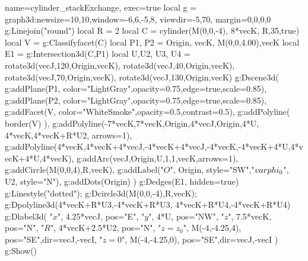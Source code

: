 \begin{luadraw}{name=cylinder_stackExchange, exec=true}
local g = graph3d:new{size={10,10},window={-6,6,-5,8}, viewdir={-5,70}, margin={0,0,0,0}}
g:Linejoin("round")
local R = 2
local C = cylinder(M(0,0,-4), 8*vecK, R,35,true)
local V = g:Classifyfacet(C)
local P1, P2 = {Origin, vecK}, {M(0,0,4.00),vecK}
local E1 = g:Intersection3d(C,P1)
local U,U2, U3, U4 = rotate3d(vecJ,120,{Origin,vecK}), rotate3d(vecJ,40,{Origin,vecK}), rotate3d(vecJ,70,{Origin,vecK}), rotate3d(vecJ,130,{Origin,vecK})
g:Dscene3d(
    g:addPlane(P1, {color="LightGray",opacity=0.75,edge=true,scale=0.85}),
    g:addPlane(P2, {color="LightGray",opacity=0.75,edge=true,scale=0.85}),
    g:addFacet(V, {color="WhiteSmoke",opacity=0.5,contrast=0.5}),
    g:addPolyline( border(V) ),
    g:addPolyline({{-7*vecK,7*vecK},{Origin,4*vecJ},{Origin,4*U}, {4*vecK,4*vecK+R*U2}}, {arrows=1}),
    g:addPolyline({4*vecK,4*vecK+4*vecJ,-4*vecK+4*vecJ,-4*vecK,-4*vecK+4*U,4*vecK+4*U,4*vecK}),
    g:addArc(vecJ,Origin,U,1,1,vecK,{arrows=1}),
    g:addCircle(M(0,0,4),R,vecK),
    g:addLabel("$O$", Origin, {style="SW"},"$\\varphi_0$", U2, {style="N"}),
    g:addDots(Origin)
)
g:Dedges(E1, {hidden=true})
g:Linestyle("dotted"); g:Dcircle3d(M(0,0,-4),R,vecK);
g:Dpolyline3d({{4*vecK+R*U3,-4*vecK+R*U3}, {4*vecK+R*U4,-4*vecK+R*U4}})
g:Dlabel3d(
    "$x$", 4.25*vecJ, {pos="E"},
    "$y$", 4*U, {pos="NW"},
    "$z$", 7.5*vecK, {pos="N"},
    "$R$", 4*vecK+2.5*U2, {pos="N"},
    "$z=z_0$", M(-4,-4.25,4), {pos="SE",dir={vecJ,-vecI}},
    "$z=0$", M(-4,-4.25,0), {pos="SE",dir={vecJ,-vecI}}
)
g:Show()
\end{luadraw}
